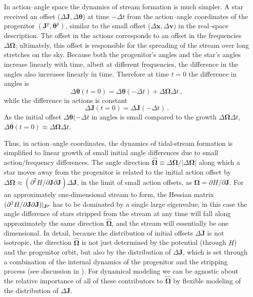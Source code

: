 \documentclass[12pt,preprint]{aastex}
\renewcommand{\vec}[1]{\ensuremath{\mathbf{#1}}}
\newcommand{\unitvec}[1]{\ensuremath{\mathbf{\hat{#1}}}}
\newcommand{\vecx}{\ensuremath{\vec{x}}}
\newcommand{\vecv}{\ensuremath{\vec{v}}}
\newcommand{\vecj}{\ensuremath{\vec{J}}}
\newcommand{\veco}{\ensuremath{\vec{\Omega}}}
\newcommand{\veca}{\ensuremath{\boldsymbol\theta}}
\begin{document}
In action--angle space the dynamics of stream formation is much
simpler. A star received an offset ($\Delta \vecj,\Delta \veca$) at
time $-\Delta t$ from the action--angle coordinates of the progenitor
$(\vecj^p,\veca^p)$, similar to the small offset ($\Delta \vecx,\Delta
\vecv)$ in the real--space description. The offset in the actions
corresponds to an offset in the frequencies $\Delta \veco$;
ultimately, this offset is responsible for the spreading of the stream
over long stretches on the sky. Because both the progenitor's angles and
the star's angles increase linearly with time, albeit at different
frequencies, the difference in the angles also increases linearly in
time. Therefore at time $t=0$ the difference in angles is
\begin{equation}
\Delta \veca(t=0) = \Delta \veca(-\Delta t) + \Delta \veco \Delta t\,,
\end{equation}
while the difference in actions is constant
\begin{equation}
\Delta \vecj(t=0) = \Delta \vecj(-\Delta t)\,.
\end{equation}
As the initial offset $\Delta \veca(-\Delta t$ in angles is small
compared to the growth $\Delta\veco\Delta t$, $\Delta \veca(t=0)
\approx \Delta \veco \Delta t$.

Thus, in action--angle coordinates, the dynamics of tidal-stream
formation is simplified to linear growth of small initial angle
differences due to small action/frequency differences. The angle
direction $\unitvec{\veco} \equiv \Delta \veco / | \Delta \veco|$
along which a star moves away from the progenitor is related to the
initial action offset by $\Delta \veco \approx (\partial^2 H
/ \partial \vecj \partial \vecj) \Delta \vecj$, in the limit of small
action offsets, as $\veco = \partial H / \partial \vecj$. For an
approximately one-dimensional stream to form, the Hessian matrix
$(\partial^2 H / \partial \vecj \partial \vecj)\large|_{\vecj^p}$ has
to be dominated by a single large eigenvalue; in this case the angle
difference of stars stripped from the stream at any time will fall
along approximately the same direction $\unitvec\veco$, and the stream
will essentially be one dimensional. In detail, because the
distribution of initial offsets $\Delta \vecj$ is not isotropic, the
direction $\unitvec \veco$ is not just determined by the potential
(through $H$) and the progenitor orbit, but also by the distribution
of $\Delta \vecj$, which is set through a combination of the internal
dynamics of the progenitor and the stripping process (see discussion
in \citealt{Sanders13a}). For dynamical modeling we can be agnostic
about the relative importance of all of these contributors to
$\unitvec \veco$ by flexible modeling of the distribution of $\Delta
\vecj$.
\end{document}
